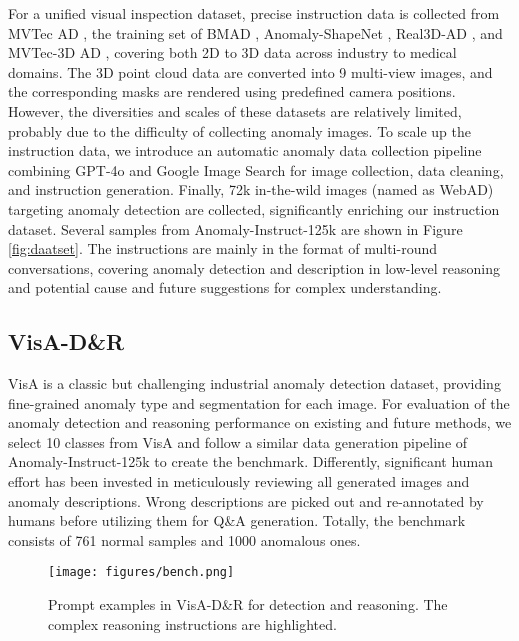 For a unified visual inspection dataset, precise instruction data is collected from MVTec AD \cite{mvtec}, the training set of BMAD \cite{bmad}, Anomaly-ShapeNet \cite{anomaly_shapenet}, Real3D-AD \cite{real3d}, and MVTec-3D AD \cite{mvtec3d}, covering both 2D to 3D data across industry to medical domains. The 3D point cloud data are converted into 9 multi-view images, and the corresponding masks are rendered using predefined camera positions. However, the diversities and scales of these datasets are relatively limited, probably due to the difficulty of collecting anomaly images. To scale up the instruction data, we introduce an automatic anomaly data collection pipeline combining GPT-4o \cite{gpt-api-4o} and Google Image Search \cite{google-image-search} for image collection, data cleaning, and instruction generation. Finally, 72k in-the-wild images (named as WebAD) targeting anomaly detection are collected, significantly enriching our instruction dataset. Several samples from Anomaly-Instruct-125k are shown in Figure \ref{fig:daatset}. The instructions are mainly in the format of multi-round conversations, covering anomaly detection and description in low-level reasoning and potential cause and future suggestions for complex understanding. 

\subsection{VisA-D\&R}
VisA \cite{visa} is a classic but challenging industrial anomaly detection dataset, providing fine-grained anomaly type and segmentation for each image. For evaluation of the anomaly detection and reasoning performance on existing and future methods, we select 10 classes from VisA and follow a similar data generation pipeline of Anomaly-Instruct-125k to create the benchmark. Differently, significant human effort has been invested in meticulously reviewing all generated images and anomaly descriptions. Wrong descriptions are picked out and re-annotated by humans before utilizing them for Q\&A generation. Totally, the benchmark consists of 761 normal samples and 1000 anomalous ones. 

\begin{figure}[t]
\centering
    \texttt{[image: figures/bench.png]}
\caption{Prompt examples in VisA-D\&R for detection and reasoning. The complex reasoning instructions are highlighted.} 
\label{fig:bench}
\vspace{-4mm}
\end{figure}

